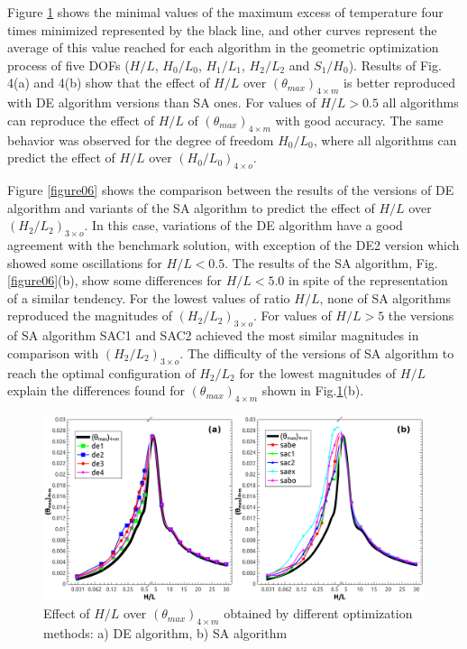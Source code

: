\documentclass[12pt,fleqn]{article}
\begin{document}
Figure \ref{figure04} shows  the minimal values of the maximum excess of temperature four times minimized represented by the black line, and other curves represent the average of this value reached for each algorithm in the geometric optimization process of five DOFs ($H/L$, $H_{0}/L_{0}$, $H_{1}/L_{1}$, $H_{2}/L_{2}$ and $S_{1}/H_{0}$). Results of Fig. 4(a) and 4(b) show that the effect of $H/L$ over $({\theta}_{max})_{4\times m}$ is better reproduced with DE algorithm versions than SA ones. For values of $H/L > 0.5$ all algorithms can reproduce the effect of $H/L$ of $({\theta}_{max})_{4\times m}$ with good accuracy. The same behavior was observed for the degree of freedom $H_{0}/L_{0}$, where all algorithms can predict the effect of $H/L$ over ${(H_{0}/L_{0})_{4\times o}}$.



Figure \ref{figure06} shows the comparison between the results of the versions of DE algorithm and variants of the SA algorithm to predict the effect of $H/L$ over ${(H_{2}/L_{2})_{3\times o}}$. In this case, variations of the DE algorithm have a good agreement with the benchmark solution, with exception of the DE2 version which showed some oscillations for $H/L< 0.5$. The results of the SA algorithm, Fig. \ref{figure06}(b), show some differences for $H/L < 5.0$ in spite of the representation of a similar tendency. For the lowest values of ratio $H/L$, none of SA algorithms reproduced the magnitudes of ${(H_{2}/L_{2})_{3\times o}}$. For values of $H/L > 5$ the versions of SA algorithm SAC1 and SAC2 achieved the most similar magnitudes in comparison with ${(H_{2}/L_{2})_{3\times o}}$. The difficulty of the versions of SA algorithm to reach the optimal configuration of $H_{2}/L_{2}$ for the lowest magnitudes of $H/L$ explain the differences found for $({\theta}_{max})_{4\times m}$ shown in Fig.\ref{figure04}(b).

\begin{figure}[H]
\centering
\includegraphics[width=1\linewidth]{imgs/5dof/de_sa_hl_tmin.png}
\caption{ {\small Effect of $H/L$ over $({\theta}_{max})_{4\times m}$ obtained by different optimization methods: a) DE algorithm, b) SA algorithm}}
\label{figure04}
\end{figure}
\end{document}
